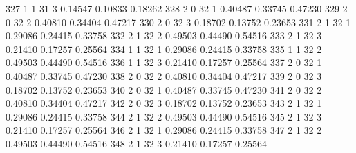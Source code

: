 \documentclass{article}
\begin{document}
\begin{Woutput}
 327      1       1      31       3       0.14547    0.10833    0.18262
 328      2       0      32       1       0.40487    0.33745    0.47230
 329      2       0      32       2       0.40810    0.34404    0.47217
 330      2       0      32       3       0.18702    0.13752    0.23653
 331      2       1      32       1       0.29086    0.24415    0.33758
 332      2       1      32       2       0.49503    0.44490    0.54516
 333      2       1      32       3       0.21410    0.17257    0.25564
 334      1       1      32       1       0.29086    0.24415    0.33758
 335      1       1      32       2       0.49503    0.44490    0.54516
 336      1       1      32       3       0.21410    0.17257    0.25564
 337      2       0      32       1       0.40487    0.33745    0.47230
 338      2       0      32       2       0.40810    0.34404    0.47217
 339      2       0      32       3       0.18702    0.13752    0.23653
 340      2       0      32       1       0.40487    0.33745    0.47230
 341      2       0      32       2       0.40810    0.34404    0.47217
 342      2       0      32       3       0.18702    0.13752    0.23653
 343      2       1      32       1       0.29086    0.24415    0.33758
 344      2       1      32       2       0.49503    0.44490    0.54516
 345      2       1      32       3       0.21410    0.17257    0.25564
 346      2       1      32       1       0.29086    0.24415    0.33758
 347      2       1      32       2       0.49503    0.44490    0.54516
 348      2       1      32       3       0.21410    0.17257    0.25564


\end{Woutput}
\end{document}
